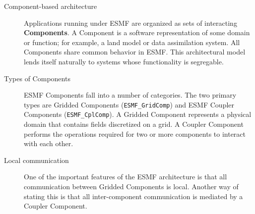 \begin{description}
\item[Component-based architecture]  Applications running under ESMF are organized as sets of 
interacting {\bf Components}.  A Component is
a software representation of some domain or function; for example, a land model or data 
assimilation 
system.  All Components share common behavior in ESMF.  This architectural model lends itself 
naturally to systems whose functionality is segregable.

\item[Types of Components]  ESMF Components fall into a number of categories.  The two primary 
types are Gridded 
Components ({\tt ESMF\_GridComp}) and ESMF Coupler Components ({\tt ESMF\_CplComp}).  A 
Gridded Component represents 
a physical domain that contains fields discretized on a grid.  A Coupler Component performs the operations required for two or more components to interact with each other.

\item[Local communication]

One of the important features of the ESMF architecture is that all communication between 
Gridded Components is 
local.  Another way of stating this is that all inter-component communication is mediated 
by a Coupler Component.    
\end{description}





















